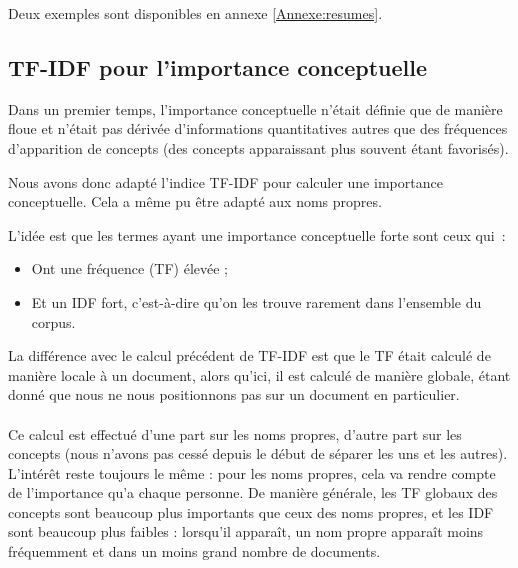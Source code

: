 \documentclass[a4paper, 12pt]{article}
\begin{document}
Deux exemples sont disponibles en annexe \ref{Annexe:resumes}.


\subsection{TF-IDF pour l'importance conceptuelle}

Dans un premier temps, l'importance conceptuelle n'était définie que de manière floue et n'était pas dérivée d'informations quantitatives autres que des fréquences d'apparition de concepts (des concepts apparaissant plus souvent étant favorisés).

Nous avons donc adapté l'indice TF-IDF pour calculer une importance conceptuelle. Cela a même pu être adapté aux noms propres.

L'idée est que les termes ayant une importance conceptuelle forte sont ceux qui~:
\begin{itemize}
 \item Ont une fréquence (TF) élevée ;
 \item Et un IDF fort, c'est-à-dire qu'on les trouve rarement dans l'ensemble du corpus.
\end{itemize}

La différence avec le calcul précédent de TF-IDF est que le TF était calculé de manière locale à un document, alors qu'ici, il est calculé de manière globale, étant donné que nous ne nous positionnons pas sur un document en particulier.

\paragraph{}
Ce calcul est effectué d'une part sur les noms propres, d'autre part sur les concepts (nous n'avons pas cessé depuis le début de séparer les uns et les autres). L'intérêt reste toujours le même : pour les noms propres, cela va rendre compte de l'importance qu'a chaque personne. De manière générale, les TF globaux des concepts sont beaucoup plus importants que ceux des noms propres, et les IDF sont beaucoup plus faibles : lorsqu'il apparaît, un nom propre apparaît moins fréquemment et dans un moins grand nombre de documents.
\end{document}
